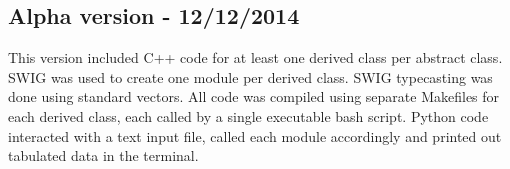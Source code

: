 \documentclass[11pt]{article}
\begin{document}
\subsection{Alpha version - 12/12/2014}
This version included C++ code for at least one derived class per
abstract class. SWIG was used to create one module per derived
class. SWIG typecasting was done using standard vectors. All code was
compiled using separate Makefiles for each derived class, each called
by a single executable bash script. Python code interacted with a text
input file, called each module accordingly and printed out tabulated
data in the terminal.
\end{document}
